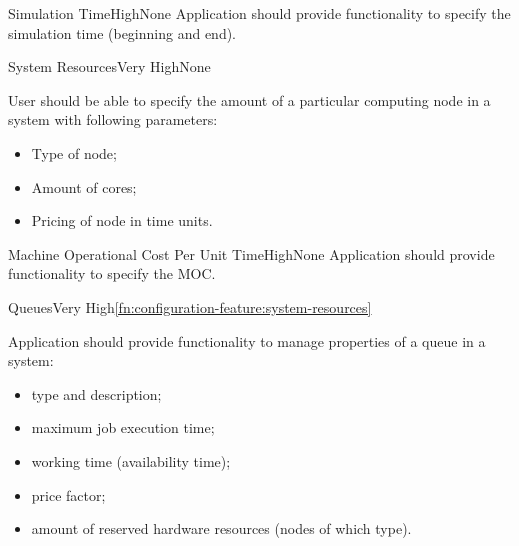 	\begin{functional}{Simulation Time}{High}{None}
		\label{fn:configuration-feature:simulation-time}
		{
			Application should provide functionality to specify the simulation time (beginning and end). 
		}
	\end{functional}

	\begin{functional}{System Resources}{Very High}{None}
		\label{fn:configuration-feature:system-resources}
		{
			User should be able to specify the amount of a particular \gls{computing node} in a system with following parameters:
			\begin{itemize}
				\item Type of node;
				\item Amount of cores;
				\item Pricing of node in time units.
			\end{itemize}
		}
	\end{functional}

	\begin{functional}{Machine Operational Cost Per Unit Time}{High}{None}
		\label{fn:configuration-feature:machine-opertional-cost-per-unit-time}
		{
			Application should provide functionality to specify the \gls{MOC}. 
		}
	\end{functional}

	\begin{functional}{Queues}{Very High}{\ref{fn:configuration-feature:system-resources}}
		\label{fn:configuration-feature:queues}
		{
			Application should provide functionality to manage properties of a queue in a system:
			\begin{itemize}
				\item type and description;
				\item maximum job execution time;
				\item working time (availability time);
				\item price factor;
				\item amount of reserved hardware resources (nodes of which type).
			\end{itemize} 
		}
	\end{functional}


